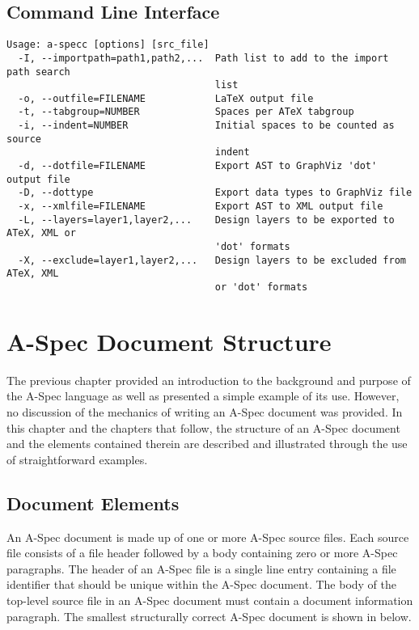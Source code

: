 \documentclass[letterpaper,10pt,draft]{book}
\begin{document}
\section{Command Line Interface}
   \label{sect:CLI}

\begin{verbatim}
Usage: a-specc [options] [src_file]
  -I, --importpath=path1,path2,...  Path list to add to the import path search
                                    list
  -o, --outfile=FILENAME            LaTeX output file
  -t, --tabgroup=NUMBER             Spaces per ATeX tabgroup
  -i, --indent=NUMBER               Initial spaces to be counted as source
                                    indent
  -d, --dotfile=FILENAME            Export AST to GraphViz 'dot' output file
  -D, --dottype                     Export data types to GraphViz file
  -x, --xmlfile=FILENAME            Export AST to XML output file
  -L, --layers=layer1,layer2,...    Design layers to be exported to ATeX, XML or
                                    'dot' formats
  -X, --exclude=layer1,layer2,...   Design layers to be excluded from ATeX, XML
                                    or 'dot' formats
\end{verbatim}

\chapter{A-Spec Document Structure}
   \label{ch:DocStructure}

The previous chapter provided an introduction to the background and purpose of the
A-Spec language as well as presented a simple example of its use.  However, no discussion
of the mechanics of writing an A-Spec document was provided.  In this chapter and
the chapters that follow, the structure of an A-Spec document and the elements contained
therein are described and illustrated through the use of straightforward examples.

\section{Document Elements}
   \label{sect:DocElem}

An A-Spec document is made up of one or more A-Spec source files.  Each source file
consists of a file header followed by a body containing zero or more A-Spec paragraphs.
The header of an A-Spec file is a single line entry containing a file identifier
that should be unique within the A-Spec document. The body of the top-level source
file in an A-Spec document must contain a document information paragraph.  The smallest
structurally correct A-Spec document is shown in  below.
\end{document}
